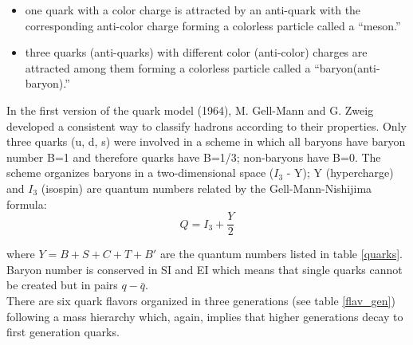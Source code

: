 \begin{itemize}
\item one quark with a color charge is attracted by an anti-quark with the corresponding anti-color charge forming a colorless particle called a ``meson.''
\item three quarks (anti-quarks) with different color (anti-color) charges are attracted among them forming a colorless particle called a ``baryon(anti-baryon).''          
\end{itemize}

\noindent In the first version of the quark model (1964), M. Gell-Mann\cite{gellman} and G. Zweig\cite{zweig,zweig2} developed a consistent way to classify hadrons according to their properties. Only three quarks (u, d, s) were involved in a scheme in which all baryons have baryon number B=1 and therefore quarks have B=1/3; non-baryons have B=0. The scheme organizes baryons in a two-dimensional space ($I_3$ - Y); Y (hypercharge) and $I_3$ (isospin) are quantum numbers related by the Gell-Mann-Nishijima formula\cite{gell_ni,gell_ni2}:
\begin{equation}
Q=I_3 + \frac{Y}{2}
\label{gmn}
\end{equation}

\noindent where $Y=B+S+C+T+B'$ are the quantum numbers listed in table \ref{quarks}. Baryon number is conserved in SI and EI which means that single quarks cannot be created but in pairs $q-\bar{q}$.\\

\noindent There are six quark flavors organized in three generations (see table \ref{flav_gen}) following a mass hierarchy which, again, implies that higher generations decay to first generation quarks.

